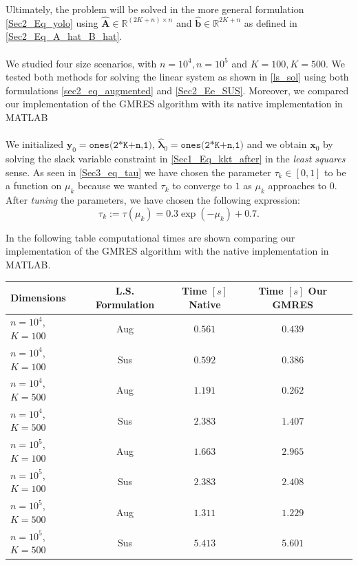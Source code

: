 Ultimately, the problem will be solved in the more general formulation \ref{Sec2_Eq_yolo} using $\hat{\mathbf{A}}\in \mathbb{R}^{(2K + n)\times n}$ and $\hat{\bm{b}}\in \mathbb{R}^{2K + n}$ as defined in \ref{Sec2_Eq_A_hat_B_hat}.\\
\\
\noindent We studied four size scenarios, with $n=10^4, n=10^5$ and $K=100, K=500$. We tested both methods for solving the linear system as shown in \ref{ls_sol} using both formulations \ref{sec2_eq_augmented} and \ref{Sec2_Ee_SUS}. Moreover, we compared our implementation of the GMRES algorithm with its native implementation in MATLAB\\
\\
\noindent We initialized $\bm{y}_0 = \texttt{ones(2*K+n,1)}$, $ \hat{\bm{\lambda}}_0 = \texttt{ones(2*K+n,1)}$ and we obtain $\bm{x}_0$ by solving the slack variable constraint in \eqref{Sec1_Eq_kkt_after} in the \textit{least squares} sense. As seen in  \eqref{Sec3_eq_tau} we have chosen the parameter $\tau_k \in [0,1]$ to be a function on $\mu_k$ because we wanted $\tau_k$ to converge to $1$ as $\mu_k$ approaches to 0. After  \textit{tuning} the parameters, we have chosen the following expression:
\begin{equation}
    \tau_k := \tau(\mu_k) = 0.3 \exp{(-\mu_k)} + 0.7.
\end{equation}

In the following table computational times are shown comparing our implementation of the GMRES algorithm with the native implementation in MATLAB.
{\begin{center}
    \begin{tabular}{|l|c|c|c|r|} 
     \hline Dimensions & L.S. Formulation &Time $[s]$ Native & Time $[s]$ Our GMRES \\
       \hline    
       $ n=10^4$, $K=100$ & Aug & $ 0.561$ &$0.439$  \\
       \hline
       $ n=10^4$, $K=100$ & Sus & $ 0.592$ &$0.386$  \\
       \hline
       $ n=10^4$, $K=500$ & Aug & $ 1.191$ &$0.262$  \\
       \hline
       $ n=10^4$, $K=500$ & Sus & $ 2.383$ &$1.407$  \\
       \hline
       $ n=10^5$, $K=100$ & Aug & $ 1.663$ &$2.965$  \\
       \hline
       $ n=10^5$, $K=100$ & Sus & $ 2.383$ &$2.408$  \\
       \hline
       $ n=10^5$, $K=500$ & Aug & $ 1.311$ &$1.229$  \\
       \hline
       $ n=10^5$, $K=500$ & Sus & $ 5.413$ &$5.601$  \\
       \hline

  \end{tabular}
  
\end{center}}

